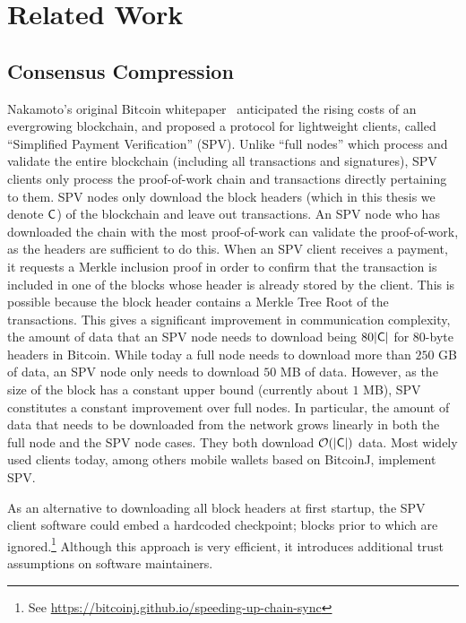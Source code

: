 \section{Related Work}

\subsection{Consensus Compression}
Nakamoto's original Bitcoin whitepaper~\cite{bitcoin} anticipated the rising
costs of an evergrowing blockchain, and proposed a protocol for lightweight
clients, called ``Simplified Payment Verification'' (SPV). Unlike ``full nodes''
which process and validate the entire blockchain (including all transactions and
signatures), SPV clients only process the proof-of-work chain and transactions
directly pertaining to them. SPV nodes only download the block headers (which in
this thesis we denote $\mathsf{C}$) of the blockchain and leave out transactions. An
SPV node who has downloaded the chain with the most proof-of-work can validate
the proof-of-work, as the headers are sufficient to do this.
When an SPV client receives a
payment, it requests a Merkle inclusion proof in
order to confirm that the transaction is included in one of the blocks whose
header is already stored by the client. This is possible because the block
header contains a Merkle Tree Root of the transactions.
This gives a significant improvement in communication
complexity, the amount of data that an SPV node needs to download being
$80|\mathsf{C}|$ for $80$-byte headers in Bitcoin. While today a full node needs to
download more than $250$ GB of data, an SPV node only needs to download $50$ MB
of data. However, as the size of the block has a constant upper bound (currently
about $1$ MB), SPV constitutes a constant improvement over full nodes. In
particular, the amount of data that needs to be downloaded from the network
grows linearly in both the full node and the SPV node cases. They both download
$\mathcal{O}(|\mathsf{C}|)$ data.
Most widely used clients today, among others
mobile wallets based on BitcoinJ, implement SPV.

As an alternative to downloading all block headers at first startup, the SPV
client software could embed a hardcoded checkpoint; blocks prior to which are
ignored.\footnote{See \url{https://bitcoinj.github.io/speeding-up-chain-sync}}
Although this approach is very efficient, it introduces
additional trust assumptions on software maintainers.

